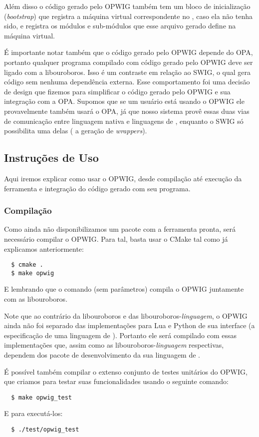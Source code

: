 Além disso o código gerado pelo OPWIG também tem um bloco de inicialização
(\textit{bootstrap}) que registra a máquina virtual correspondente no \SMgr{},
caso ela não tenha sido, e registra os módulos e sub-módulos que esse arquivo
gerado define na máquina virtual.

É importante notar também que o código gerado pelo OPWIG depende do OPA, 
portanto qualquer programa compilado com código gerado pelo OPWIG deve ser
ligado com a libouroboros. Isso é um contraste em relação ao SWIG, o qual gera
código sem nenhuma dependência externa. Esse comportamento foi uma decisão de
design que fizemos para simplificar o código gerado pelo OPWIG e sua integração
com a OPA. Supomos que se um usuário está usando o OPWIG ele provavelmente
também usará o OPA, já que nosso sistema provê essas duas vias de comunicação
entre linguagem nativa e linguagens de \script{}, enquanto o SWIG só possibilita
uma delas ( a geração de \textit{wrappers}).

\subsection{Instruções de Uso}
Aqui iremos explicar como usar o OPWIG, desde compilação até execução da ferramenta
e integração do código gerado com seu programa.

\subsubsection{Compilação}
Como ainda não disponibilizamos um pacote com a ferramenta pronta, será necessário
compilar o OPWIG. Para tal, basta usar o CMake tal como já explicamos anteriormente:
\begin{verbatim}
  $ cmake .
  $ make opwig
\end{verbatim}
E lembrando que o comando  (sem parâmetros) compila o OPWIG juntamente com
as libouroboros.

Note que ao contrário da libouroboros e das libouroboros-\textit{linguagem}, o OPWIG
ainda não foi separado das implementações para Lua e Python de sua interface 
(a especificação de uma linguagem de \script{}). Portanto ele será compilado com 
essas implementações que, assim como as libouroboros-\textit{linguagem} respectivas,
dependem dos pacote de desenvolvimento da sua linguagem de \script{}.

É possível também compilar o extenso conjunto de testes unitários do OPWIG, que
criamos para testar suas funcionalidades usando o seguinte comando:
\begin{verbatim}
  $ make opwig_test
\end{verbatim}
E para executá-los:
\begin{verbatim}
  $ ./test/opwig_test
\end{verbatim}

